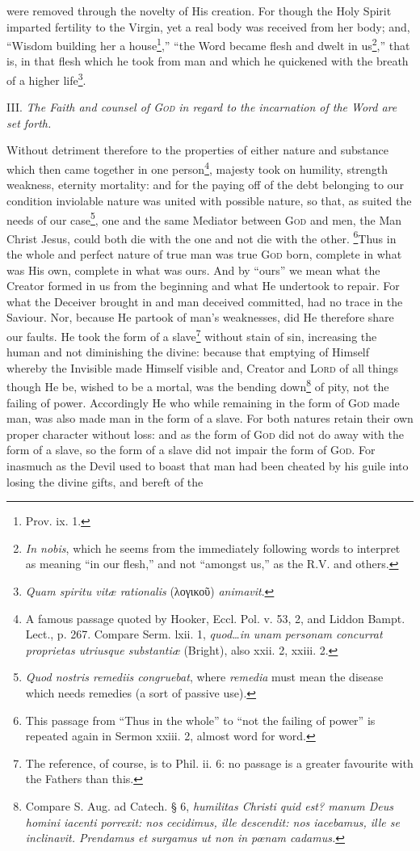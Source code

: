 were removed through the novelty of His creation. For though the Holy Spirit imparted fertility to the Virgin, yet a real body was received from her body; and, “Wisdom building her a house\footnote{Prov. ix. 1.},” “the Word became flesh and dwelt in us\footnote{\emph{In nobis}, which he seems from the immediately following words to interpret as meaning “in our flesh,” and not “amongst us,” as the R.V. and others.},” that is, in that flesh which he took from man and which he quickened with the breath of a higher life\footnote{\emph{Quam spiritu vitæ rationalis} (\textgreek{λογικοῦ}) \emph{animavit}.}.

III. \emph{The Faith and counsel of \textsc{God} in regard to the incarnation of the Word are set forth.}

Without detriment therefore to the properties of either nature and substance which then came together in one person\footnote{A famous passage quoted by Hooker, Eccl. Pol. v. 53, 2, and Liddon Bampt. Lect., p. 267. Compare Serm. lxii. 1, \emph{quod…in unam personam concurrat proprietas utriusque substantiæ} (Bright), also xxii. 2, xxiii. 2.}, majesty took on humility, strength weakness, eternity mortality: and for the paying off of the debt belonging to our condition inviolable nature was united with possible nature, so that, as suited the needs of our case\footnote{\emph{Quod nostris remediis congruebat}, where \emph{remedia} must mean the disease which needs remedies (a sort of passive use).}, one and the same Mediator between \textsc{God} and men, the Man Christ Jesus, could both die with the one and not die with the other. \footnote{This passage from “Thus in the whole” to “not the failing of power” is repeated again in Sermon xxiii. 2, almost word for word.}Thus in the whole and perfect nature of true man was true \textsc{God} born, complete in what was His own, complete in what was ours. And by “ours” we mean what the Creator formed in us from the beginning and what He undertook to repair. For what the Deceiver brought in and man deceived committed, had no trace in the Saviour. Nor, because He partook of man’s weaknesses, did He therefore share our faults. He took the form of a slave\footnote{The reference, of course, is to Phil. ii. 6: no passage is a greater favourite with the Fathers than this.} without stain of sin, increasing the human and not diminishing the divine: because that emptying of Himself whereby the Invisible made Himself visible and, Creator and \textsc{Lord} of all things though He be, wished to be a mortal, was the bending down\footnote{Compare S. Aug. ad Catech. § 6, \emph{humilitas Christi quid est? manum Deus homini iacenti porrexit: nos cecidimus, ille descendit: nos iacebamus, ille se inclinavit. Prendamus et surgamus ut non in pœnam cadamus.}} of pity, not the failing of power. Accordingly He who while remaining in the form of \textsc{God} made man, was also made man in the form of a slave. For both natures retain their own proper character without loss: and as the form of \textsc{God} did not do away with the form of a slave, so the form of a slave did not impair the form of \textsc{God}. For inasmuch as the Devil used to boast that man had been cheated by his guile into losing the divine gifts, and bereft of the 